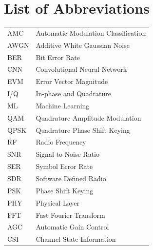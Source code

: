 \chapter*{List of Abbreviations}

\begin{table}[!ht]
\begin{tabular}{p{3cm} p{10cm}}
AMC & Automatic Modulation Classification \\
AWGN & Additive White Gaussian Noise \\
BER & Bit Error Rate \\
CNN & Convolutional Neural Network \\
EVM & Error Vector Magnitude \\
I/Q & In-phase and Quadrature \\
ML & Machine Learning \\
QAM & Quadrature Amplitude Modulation \\
QPSK & Quadrature Phase Shift Keying \\
RF & Radio Frequency \\
SNR & Signal-to-Noise Ratio \\
SER & Symbol Error Rate \\
SDR & Software Defined Radio \\
PSK & Phase Shift Keying \\
PHY & Physical Layer \\
FFT & Fast Fourier Transform \\
AGC & Automatic Gain Control \\
CSI & Channel State Information \\
\end{tabular}
\end{table}
